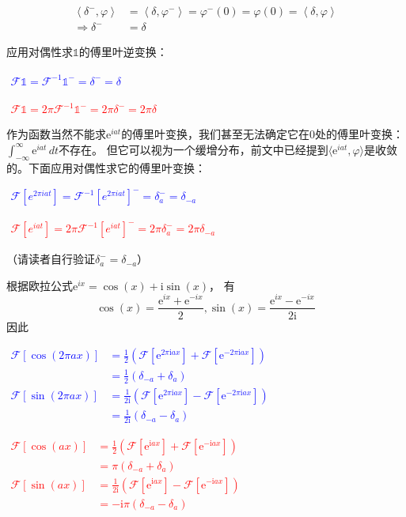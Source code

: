 \documentclass{ctexbook}
\newcommand{\lr}[2]{%
    \begin{center}
    \begin{minipage}[t]{0.45\textwidth}
        \centering
        \allowdisplaybreaks
        \textcolor{blue}{%
            \begin{varwidth}{\linewidth}
            $\begin{aligned}
            #1
            \end{aligned}$
            \end{varwidth}
        }
    \end{minipage}
    \hfill
    \begin{minipage}[t]{0.45\textwidth}
        \centering
        \allowdisplaybreaks
        \textcolor{red}{%
            \begin{varwidth}{\linewidth}
            $\begin{aligned}
            #2
            \end{aligned}$
            \end{varwidth}
        }
    \end{minipage}
\end{center}
}
\begin{document}
\begin{example}
    \begin{align*}
    \left\langle \delta^-,\varphi\right\rangle & =\left\langle \delta,\varphi^-\right\rangle=\varphi^-(0)=\varphi(0)=\left\langle \delta,\varphi\right\rangle \\
    \Rightarrow \delta^-            & =\delta
\end{align*}
\end{example}

\begin{example}
应用对偶性求$\mathds{1}$的傅里叶逆变换：
\lr{
    \mathcal{F} \mathds{1}=\mathcal{F} ^{-1}\mathds{1}^-=\delta^-=\delta
}{
    \mathcal{F} \mathds{1}=2\pi\mathcal{F} ^{-1}\mathds{1}^- =2\pi\delta^- =2\pi\delta
}
\end{example}
\begin{example}
作为函数当然不能求$\mathrm{e}^{iat}$的傅里叶变换，我们甚至无法确定它在0处的傅里叶变换：$\int_{-\infty}^{\infty}\mathrm{e}^{iat}\,dt$不存在。
但它可以视为一个缓增分布，前文中已经提到$\langle \mathrm{e}^{iat},\varphi\rangle$是收敛
的。下面应用对偶性求它的傅里叶变换：
\lr{
\mathcal{F} [e^{2\pi iat}]=\mathcal{F}^{-1}[e^{2\pi iat}]^-=\delta_{a}^-=\delta_{-a}
}{
\mathcal{F} [e^{iat}]=2\pi\mathcal{F}^{-1}[e^{iat}]^- =2\pi\delta_{a}^- =2\pi\delta_{-a}
}
（请读者自行验证$\delta_{a}^-= \delta_{-a}$）
\end{example}

\begin{example}[正弦、余弦函数的傅里叶变换]
根据欧拉公式$\mathrm{e}^{ix}=\cos(x)+\mathrm{i}\sin(x)$，
有\[\cos(x)=\frac{\mathrm{e}^{ix}+\mathrm{e}^{-ix}}{2},\sin(x)=\frac{\mathrm{e}^{ix}-\mathrm{e}^{-ix}}{2\mathrm{i}}\]因此
\lr{
    \mathcal{F} [\cos(2\pi ax)]&=\frac{1}{2}(\mathcal{F} [\mathrm{e}^{2\pi \mathrm{i}ax}]+\mathcal{F} [\mathrm{e}^{-2\pi \mathrm{i}ax}])\\
    &=\frac{1}{2}(\delta_{-a}+\delta_{a}) \\
    \mathcal{F} [\sin(2\pi ax)]&=\frac{1}{2\mathrm{i}}(\mathcal{F} [\mathrm{e}^{2\pi \mathrm{i}ax}]-\mathcal{F} [\mathrm{e}^{-2\pi \mathrm{i}ax}])\\
    &=\frac{1}{2\mathrm{i}}(\delta_{-a}-\delta_{a})
}{
    \mathcal{F} [\cos(ax)]&=\frac{1}{2}(\mathcal{F} [\mathrm{e}^{\mathrm{i}ax}]+\mathcal{F} [\mathrm{e}^{-\mathrm{i}ax}])\\
    &=\pi(\delta_{-a}+\delta_{a}) \\
    \mathcal{F} [\sin(ax)]&=\frac{1}{2\mathrm{i}}(\mathcal{F} [\mathrm{e}^{\mathrm{i}ax}]-\mathcal{F} [\mathrm{e}^{-\mathrm{i}ax}])\\
    &=-\mathrm{i}\pi(\delta_{-a}-\delta_{a})
}
\end{example}
\end{document}
